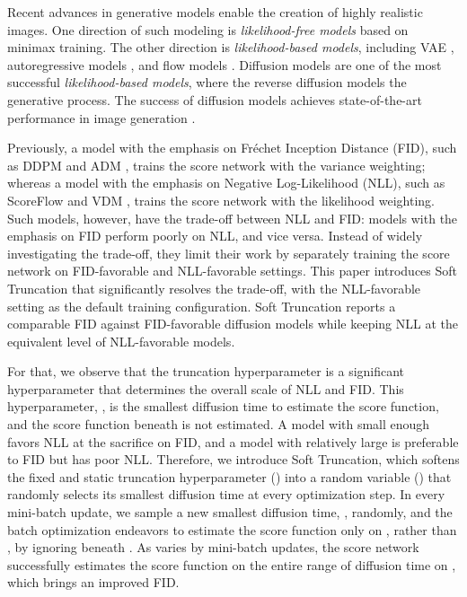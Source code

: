 \documentclass[nohyperref]{article}
\theoremstyle{plain}
\theoremstyle{definition}
\theoremstyle{remark}
\begin{document}
Recent advances in generative models enable the creation of highly realistic images. One direction of such modeling is \textit{likelihood-free models} \citep{karras2019style} based on minimax training. The other direction is \textit{likelihood-based models}, including VAE \cite{vahdat2020nvae}, autoregressive models \citep{parmar2018image}, and flow models \citep{grcic2021densely}. Diffusion models \citep{ho2020denoising} are one of the most successful \textit{likelihood-based models}, where the reverse diffusion models the generative process. The success of diffusion models achieves state-of-the-art performance in image generation \citep{dhariwal2021diffusion}.

Previously, a model with the emphasis on Fr\'echet Inception Distance (FID), such as DDPM \cite{ho2020denoising} and ADM \cite{dhariwal2021diffusion}, trains the score network with the variance weighting; whereas a model with the emphasis on Negative Log-Likelihood (NLL), such as ScoreFlow \cite{song2021maximum} and VDM \cite{kingma2021variational}, trains the score network with the likelihood weighting. Such models, however, have the trade-off between NLL and FID: models with the emphasis on FID perform poorly on NLL, and vice versa. Instead of widely investigating the trade-off, they limit their work by separately training the score network on FID-favorable and NLL-favorable settings. This paper introduces Soft Truncation that significantly resolves the trade-off, with the NLL-favorable setting as the default training configuration. Soft Truncation reports a comparable FID against FID-favorable diffusion models while keeping NLL at the equivalent level of NLL-favorable models.

For that, we observe that the truncation hyperparameter is a significant hyperparameter that determines the overall scale of NLL and FID. This hyperparameter, , is the smallest diffusion time to estimate the score function, and the score function beneath  is not estimated. A model with small enough  favors NLL at the sacrifice on FID, and a model with relatively large  is preferable to FID but has poor NLL. Therefore, we introduce Soft Truncation, which softens the fixed and static truncation hyperparameter () into a random variable () that randomly selects its smallest diffusion time at every optimization step. In every mini-batch update, we sample a new smallest diffusion time, , randomly, and the batch optimization endeavors to estimate the score function only on , rather than , by ignoring beneath . As  varies by mini-batch updates, the score network successfully estimates the score function on the entire range of diffusion time on , which brings an improved FID. 
\end{document}

